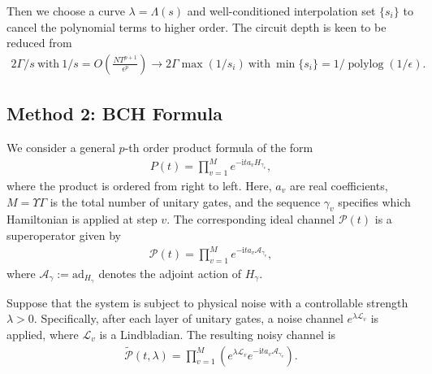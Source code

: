 \documentclass[11pt]{article}
\renewcommand{\i}{\mathrm{i}}
\renewcommand{\L}{\mathcal{L}}
\newcommand{\ad}{\mathrm{ad}}
\renewcommand{\P}{\mathcal{P}}
\newcommand{\A}{\mathcal{A}}
\begin{document}
Then we choose a curve $\lambda=\Lambda(s)$ and well-conditioned interpolation set $\{s_i\}$ to cancel the polynomial terms to higher order. The circuit depth is keen to be reduced from 
\begin{align*}
    2\Gamma/s~\text{with}~1/s= O(\frac{NT^{p+1}}{\epsilon^{p}})\longrightarrow 2\Gamma\max (1/s_i)~\text{with}~\min\{s_i\} = 1/\operatorname{polylog}(1/\epsilon).
\end{align*}
\subsection{Method 2: BCH Formula}
We consider a general $p$-th order product formula of the form
\begin{align*}
    P(t) = \prod_{v=1}^Me^{-\i t a_{v} H_{\gamma_v}},
\end{align*}
where the product is ordered from right to left. Here, $a_{v}$ are real coefficients, $M = \Upsilon\Gamma$ is the total number of unitary gates, and the sequence $\gamma_v$ specifies which Hamiltonian is applied at step $v$. The corresponding ideal channel $\P(t)$ is a superoperator given by
\begin{align*}
    \P(t) = \prod_{v=1}^Me^{-\i t a_{v} \A_{\gamma_v}},
\end{align*}
where $\A_{\gamma}:=\ad_{H_{\gamma}}$ denotes the adjoint action of $H_{\gamma}$.

Suppose that the system is subject to physical noise with a controllable strength $\lambda>0$. Specifically, after each layer of unitary gates, a noise channel $e^{\lambda \L_{v}}$ is applied, where $\L_{v}$ is a Lindbladian. The resulting noisy channel is
\begin{align*}
    \tilde{\P}(t,\lambda)=\prod_{v=1}^M\left( e^{\lambda \L_{v}} e^{-\i t a_{v} \A_{\gamma_v}} \right).
\end{align*}
\end{document}
